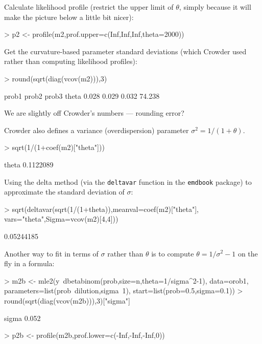 \documentclass{article}
\newcommand{\code}[1]{{\tt #1}}
\begin{document}
Calculate likelihood profile (restrict the upper limit
of $\theta$, simply because it will make the picture
below a little bit nicer):
\begin{Schunk}
\begin{Sinput}
> p2 <- profile(m2,prof.upper=c(Inf,Inf,Inf,theta=2000))
\end{Sinput}
\end{Schunk}

Get the curvature-based parameter standard
deviations (which Crowder used
rather than computing likelihood profiles):
\begin{Schunk}
\begin{Sinput}
> round(sqrt(diag(vcov(m2))),3)
\end{Sinput}
\begin{Soutput}
 prob1  prob2  prob3  theta 
 0.028  0.029  0.032 74.238 
\end{Soutput}
\end{Schunk}
We are slightly off Crowder's numbers --- rounding
error?

Crowder also defines a variance (overdispersion) parameter
$\sigma^2=1/(1+\theta)$.
\begin{Schunk}
\begin{Sinput}
> sqrt(1/(1+coef(m2)["theta"]))
\end{Sinput}
\begin{Soutput}
    theta 
0.1122089 
\end{Soutput}
\end{Schunk}

Using the delta method (via the \code{deltavar}
function in the \code{emdbook} package)
to approximate the standard deviation of
$\sigma$:
\begin{Schunk}
\begin{Sinput}
> sqrt(deltavar(sqrt(1/(1+theta)),meanval=coef(m2)["theta"],
          vars="theta",Sigma=vcov(m2)[4,4]))
\end{Sinput}
\begin{Soutput}
[1] 0.05244185
\end{Soutput}
\end{Schunk}

Another way to fit in terms of $\sigma$ rather than $\theta$
is to compute $\theta=1/\sigma^2-1$ on the fly in a
formula:

\begin{Schunk}
\begin{Sinput}
> m2b <- mle2(y~dbetabinom(prob,size=n,theta=1/sigma^2-1),
             data=orob1,
             parameters=list(prob~dilution,sigma~1),
             start=list(prob=0.5,sigma=0.1))
> round(sqrt(diag(vcov(m2b))),3)["sigma"]
\end{Sinput}
\begin{Soutput}
sigma 
0.052 
\end{Soutput}
\begin{Sinput}
> p2b <- profile(m2b,prof.lower=c(-Inf,-Inf,-Inf,0))
\end{Sinput}
\end{Schunk}
\end{document}

